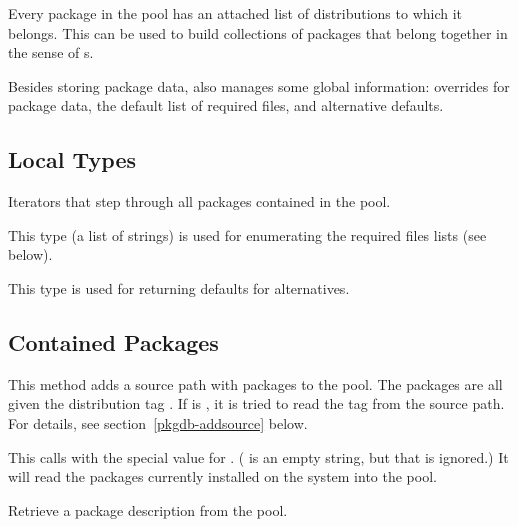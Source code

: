 \documentclass[10pt]{article}
\begin{document}
Every package in the pool has an attached list of distributions to
which it belongs. This can be used to build collections of packages
that belong together in the sense of s.

Besides storing package data,  also manages some global
information: overrides for package data, the default list of required
files, and alternative defaults.


\subsection{Local Types}
Iterators that step through all packages contained in the pool.

This type (a list of strings) is used for enumerating the required
files lists (see below).

This type is used for returning defaults for alternatives.


\subsection{Contained Packages}
This method adds a source path with packages to the pool. The packages
are all given the distribution tag . If  is
, it is tried to read the tag from the source path. For
details, see section~\ref{pkgdb-addsource} below.

This calls  with the special value
 for . ( is an empty string, but
that is ignored.) It will read the packages currently installed on the
system into the pool.

Retrieve a package description from the pool.
\end{document}
